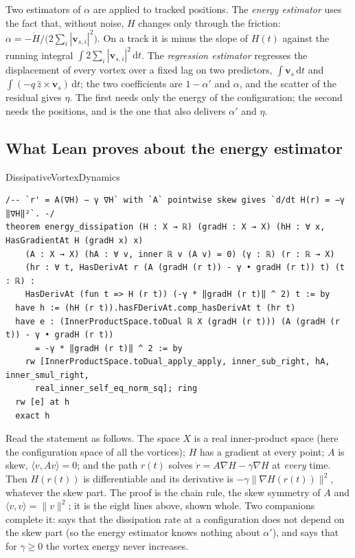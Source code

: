 Two estimators of $\alpha$ are applied to tracked positions. The \emph{energy estimator} uses the fact that, without noise, $H$ changes only through
the friction: $\alpha=-\dot H/\bigl(2\sum_i|\mathbf v_{s,i}|^2\bigr)$. On a track it is minus the slope of $H(t)$ against the running integral
$\int 2\sum_i|\mathbf v_{s,i}|^2\,\mathrm dt$. The \emph{regression estimator} regresses the displacement of every vortex over a fixed lag on two
predictors, $\int\mathbf v_s\,\mathrm dt$ and $\int(-q\,\hat z\times\mathbf v_s)\,\mathrm dt$; the two coefficients are $1-\alpha'$ and $\alpha$, and
the scatter of the residual gives $\eta$. The first needs only the energy of the configuration; the second needs the positions, and is the one that
also delivers $\alpha'$ and $\eta$.

\subsection*{What Lean proves about the energy estimator}

\begin{leanbox}{DissipativeVortexDynamics}
\begin{lstlisting}[style=lean]
/-- `r' = A(∇H) − γ ∇H` with `A` pointwise skew gives `d/dt H(r) = −γ ‖∇H‖²`. -/
theorem energy_dissipation (H : X → ℝ) (gradH : X → X) (hH : ∀ x, HasGradientAt H (gradH x) x)
    (A : X → X) (hA : ∀ v, inner ℝ v (A v) = 0) (γ : ℝ) (r : ℝ → X)
    (hr : ∀ t, HasDerivAt r (A (gradH (r t)) - γ • gradH (r t)) t) (t : ℝ) :
    HasDerivAt (fun t => H (r t)) (-γ * ‖gradH (r t)‖ ^ 2) t := by
  have h := (hH (r t)).hasFDerivAt.comp_hasDerivAt t (hr t)
  have e : (InnerProductSpace.toDual ℝ X (gradH (r t))) (A (gradH (r t)) - γ • gradH (r t))
      = -γ * ‖gradH (r t)‖ ^ 2 := by
    rw [InnerProductSpace.toDual_apply_apply, inner_sub_right, hA, inner_smul_right,
      real_inner_self_eq_norm_sq]; ring
  rw [e] at h
  exact h
\end{lstlisting}
\end{leanbox}

Read the statement as follows. The space $X$ is a real inner-product space (here the configuration space of all the vortices); $H$ has a gradient
at every point; $A$ is skew, $\langle v,Av\rangle=0$; and the path $r(t)$ solves $\dot r=A\nabla H-\gamma\nabla H$ at \emph{every} time. Then
$H(r(t))$ is differentiable and its derivative is $-\gamma\|\nabla H(r(t))\|^2$, whatever the skew part. The proof is the chain rule, the skew
symmetry of $A$ and $\langle v,v\rangle=\|v\|^2$; it is the eight lines above, shown whole. Two companions complete it:
 says that the dissipation rate at a configuration does not depend on the skew part (so
the energy estimator knows nothing about $\alpha'$), and  says that for $\gamma\ge0$ the vortex
energy never increases.


